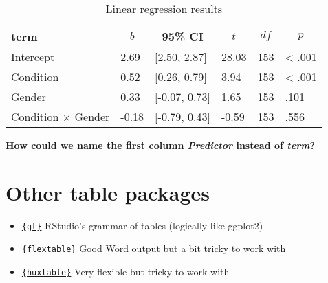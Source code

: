 \documentclass[
  doc]{apa6}
\providecommand{\tightlist}{%
  \setlength{\itemsep}{0pt}\setlength{\parskip}{0pt}}
\begin{document}
\begin{table}[h]

\begin{center}
\begin{threeparttable}

\caption{\label{tab:unnamed-chunk-23}Linear regression results}

\begin{tabular}{llllll}
\toprule
term & \multicolumn{1}{c}{$b$} & \multicolumn{1}{c}{95\% CI} & \multicolumn{1}{c}{$t$} & \multicolumn{1}{c}{$\mathit{df}$} & \multicolumn{1}{c}{$p$}\\
\midrule
Intercept & 2.69 & {}[2.50, 2.87] & 28.03 & 153 & < .001\\
Condition & 0.52 & {}[0.26, 0.79] & 3.94 & 153 & < .001\\
Gender & 0.33 & {}[-0.07, 0.73] & 1.65 & 153 & .101\\
Condition $\times$ Gender & -0.18 & {}[-0.79, 0.43] & -0.59 & 153 & .556\\
\bottomrule
\end{tabular}

\end{threeparttable}
\end{center}

\end{table}

\textbf{How could we name the first column \emph{Predictor} instead of \emph{term}?}

\newpage

\hypertarget{other-table-packages}{%
\section{Other table packages}\label{other-table-packages}}

\begin{itemize}
\tightlist
\item
  \href{https://gt.rstudio.com/index.html}{\texttt{\{gt\}}} RStudio's grammar of tables (logically like ggplot2)
\item
  \href{https://davidgohel.github.io/flextable/articles/overview.html}{\texttt{\{flextable\}}} Good Word output but a bit tricky to work with
\item
  \href{https://hughjonesd.github.io/huxtable/}{\texttt{\{huxtable\}}} Very flexible but tricky to work with
\end{itemize}
\end{document}
